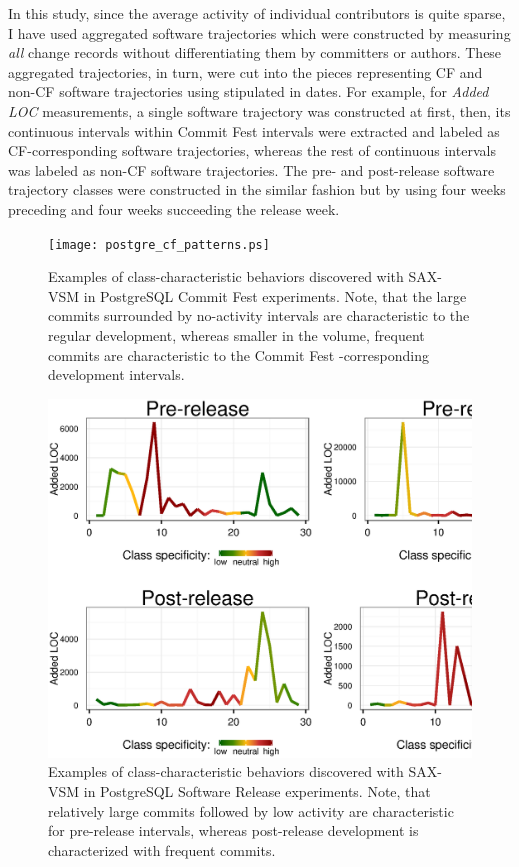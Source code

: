 In this study, since the average activity of individual contributors is quite sparse, I have used aggregated software trajectories which were constructed by measuring \textit{all} change records without differentiating them by committers or authors. These aggregated trajectories, in turn, were cut into the pieces representing CF and non-CF software trajectories using stipulated in \cite{commit-fest} dates. For example, for \textit{Added LOC} measurements, a single software trajectory was constructed at first, then, its continuous intervals within Commit Fest intervals were extracted and labeled as CF-corresponding software trajectories, whereas the rest of continuous intervals was labeled as non-CF software trajectories. The pre- and post-release software trajectory classes were constructed in the similar fashion but by using four weeks preceding and four weeks succeeding the release week.

\begin{figure}[t]
   \centering
   \texttt{[image: postgre\_cf\_patterns.ps]}
   \caption{Examples of class-characteristic behaviors discovered with SAX-VSM in PostgreSQL Commit Fest experiments. Note, that the large commits surrounded by no-activity intervals are characteristic to the regular development, whereas smaller in the volume, frequent commits are characteristic to the Commit Fest -corresponding development intervals. }
   \label{fig:postgre_cf_patterns}   
   \includegraphics[width=145mm]{figures/postgre_release_patterns.ps}
   \caption{Examples of class-characteristic behaviors discovered with SAX-VSM in PostgreSQL Software Release experiments. Note, that relatively large commits followed by low activity are characteristic for pre-release intervals, whereas post-release development is characterized with frequent commits.}
   \label{fig:postgre_release_patterns}
\end{figure}

